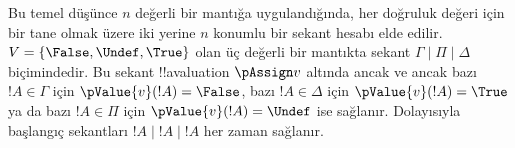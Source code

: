 Bu temel düşünce $n$ değerli bir mantığa uygulandığında, her doğruluk değeri
için bir tane olmak üzere iki yerine $n$ konumlu bir sekant hesabı elde
edilir. $V=\{\False,\Undef,\True\}$ olan üç değerli bir mantıkta sekant
$\Gamma\mid\Pi\mid\Delta$ biçimindedir. Bu sekant !!a{valuation}
$\pAssign v$ altında ancak ve ancak bazı $!A\in\Gamma$ için
$\pValue{v}(!A)=\False$, bazı $!A\in\Delta$ için
$\pValue{v}(!A)=\True$ ya da bazı $!A\in\Pi$ için
$\pValue{v}(!A)=\Undef$ ise sağlanır. Dolayısıyla başlangıç sekantları
$!A\mid !A\mid !A$ her zaman sağlanır.

